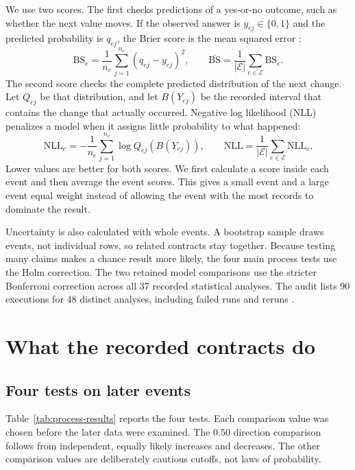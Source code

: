 \documentclass[10pt,twoside]{article}
\begin{document}
We use two scores. The first checks predictions of a yes-or-no outcome, such as whether the next value moves. If the observed answer is $y_{e j}\in\{0,1\}$ and the predicted probability is $q_{e j}$, the Brier score is the mean squared error \citep{brier1950}:
\begin{equation}
  \mathrm{BS}_e
  =\frac{1}{n_e}\sum_{j=1}^{n_e}(q_{e j}-y_{e j})^2,
  \qquad
  \overline{\mathrm{BS}}
  =\frac{1}{|\mathcal E|}\sum_{e\in\mathcal E}\mathrm{BS}_e.
  \label{eq:brier}
\end{equation}
The second score checks the complete predicted distribution of the next change. Let $Q_{e j}$ be that distribution, and let $B(Y_{e j})$ be the recorded interval that contains the change that actually occurred. Negative log likelihood (NLL) penalizes a model when it assigns little probability to what happened:
\begin{equation}
  \mathrm{NLL}_e
  =-\frac{1}{n_e}\sum_{j=1}^{n_e}\log Q_{e j}\!\left(B(Y_{e j})\right),
  \qquad
  \overline{\mathrm{NLL}}
  =\frac{1}{|\mathcal E|}\sum_{e\in\mathcal E}\mathrm{NLL}_e.
  \label{eq:nll}
\end{equation}
Lower values are better for both scores. We first calculate a score inside each event and then average the event scores. This gives a small event and a large event equal weight instead of allowing the event with the most records to dominate the result.

Uncertainty is also calculated with whole events. A bootstrap sample draws events, not individual rows, so related contracts stay together. Because testing many claims makes a chance result more likely, the four main process tests use the Holm correction. The two retained model comparisons use the stricter Bonferroni correction across all 37 recorded statistical analyses. The audit lists 90 executions for 48 distinct analyses, including failed runs and reruns \citep{chronos2026audit}.

\section{What the recorded contracts do}

\subsection{Four tests on later events}

Table~\ref{tab:process-results} reports the four tests. Each comparison value was chosen before the later data were examined. The $0.50$ direction comparison follows from independent, equally likely increases and decreases. The other comparison values are deliberately cautious cutoffs, not laws of probability.
\end{document}
